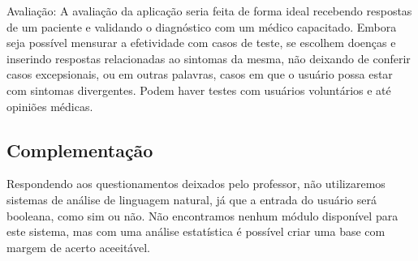 Avaliação: A avaliação da aplicação seria feita de forma ideal recebendo respostas de um paciente e validando o diagnóstico com um médico capacitado. Embora seja possível mensurar a efetividade com casos de teste, se escolhem doenças e inserindo respostas relacionadas ao sintomas da mesma, não deixando de conferir casos excepsionais, ou  em outras palavras, casos em que o usuário possa estar com sintomas divergentes.
Podem haver testes com usuários voluntários e até opiniões médicas.

\subsection{Complementação}

Respondendo aos questionamentos deixados pelo professor, não utilizaremos sistemas de análise de linguagem natural, já que a entrada do usuário será booleana, como sim ou não.
Não encontramos nenhum módulo disponível para este sistema, mas com uma análise estatística é possível criar uma base com margem de acerto aceeitável.